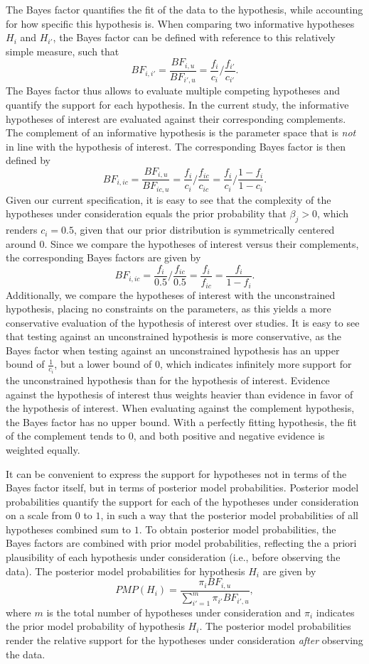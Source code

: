 \documentclass[
  11pt,
]{article}
\begin{document}
The Bayes factor quantifies the fit of the data to the hypothesis, while accounting for how specific this hypothesis is.
When comparing two informative hypotheses \(H_i\) and \(H_{i'}\), the Bayes factor can be defined with reference to this relatively simple measure, such that
\[
BF_{i,i'} = \frac{BF_{i,u}}{BF_{i',u}} = \frac{f_i}{c_i} / \frac{f_{i'}}{c_{i'}}.
\]
The Bayes factor thus allows to evaluate multiple competing hypotheses and quantify the support for each hypothesis.
In the current study, the informative hypotheses of interest are evaluated against their corresponding complements.
The complement of an informative hypothesis is the parameter space that is \emph{not} in line with the hypothesis of interest.
The corresponding Bayes factor is then defined by
\[
BF_{i, ic} = \frac{BF_{i,u}}{BF_{ic,u}} = \frac{f_i}{c_i} / \frac{f_{ic}}{c_{ic}} = \frac{f_i}{c_i} / \frac{1 - f_{i}}{1 - c_{i}}.
\]
Given our current specification, it is easy to see that the complexity of the hypotheses under consideration equals the prior probability that \(\beta_j > 0\), which renders \(c_i = 0.5\), given that our prior distribution is symmetrically centered around 0.
Since we compare the hypotheses of interest versus their complements, the corresponding Bayes factors are given by
\[
BF_{i,ic} = \frac{f_i}{0.5} / \frac{f_{ic}}{0.5} = \frac{f_i}{f_{ic}} = \frac{f_i}{1-f_i}. 
\]
Additionally, we compare the hypotheses of interest with the unconstrained hypothesis, placing no constraints on the parameters, as this yields a more conservative evaluation of the hypothesis of interest over studies.
It is easy to see that testing against an unconstrained hypothesis is more conservative, as the Bayes factor when testing against an unconstrained hypothesis has an upper bound of \(\frac{1}{c_i}\), but a lower bound of \(0\), which indicates infinitely more support for the unconstrained hypothesis than for the hypothesis of interest.
Evidence against the hypothesis of interest thus weights heavier than evidence in favor of the hypothesis of interest.
When evaluating against the complement hypothesis, the Bayes factor has no upper bound.
With a perfectly fitting hypothesis, the fit of the complement tends to \(0\), and both positive and negative evidence is weighted equally.

It can be convenient to express the support for hypotheses not in terms of the Bayes factor itself, but in terms of posterior model probabilities.
Posterior model probabilities quantify the support for each of the hypotheses under consideration on a scale from \(0\) to \(1\), in such a way that the posterior model probabilities of all hypotheses combined sum to \(1\). To obtain posterior model probabilities, the Bayes factors are combined with prior model probabilities, reflecting the a priori plausibility of each hypothesis under consideration (i.e., before observing the data).
The posterior model probabilities for hypothesis \(H_i\) are given by
\[
PMP(H_{i}) = \frac{\pi_i BF_{i,u}}{\sum^m_{i'=1} \pi_{i'} BF_{i',u}},
\]
where \(m\) is the total number of hypotheses under consideration and \(\pi_i\) indicates the prior model probability of hypothesis \(H_i\).
The posterior model probabilities render the relative support for the hypotheses under consideration \emph{after} observing the data.
\end{document}
